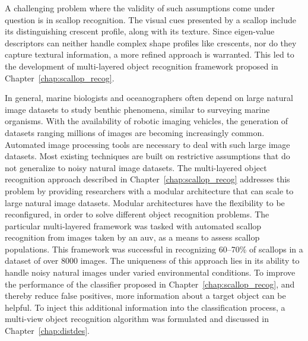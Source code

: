 A challenging problem where the validity of such assumptions come under question is in scallop recognition.
The visual cues presented by a scallop include its distinguishing crescent profile, along with its texture.
Since eigen-value descriptors can neither handle complex shape profiles like crescents, nor do they capture textural information,
a more refined approach is warranted.
This led to the development of multi-layered object recognition framework proposed in Chapter~\ref{chap:scallop_recog}.

In general, marine biologists and oceanographers often depend on large natural image datasets to study benthic phenomena, similar to surveying marine organisms. With the availability of robotic imaging vehicles, the generation of datasets ranging millions of images are becoming increasingly common. Automated image processing tools are necessary to deal with such large image datasets. Most existing techniques are built on restrictive assumptions that do not generalize to noisy natural image datasets. The multi-layered object recognition approach described in Chapter~\ref{chap:scallop_recog} addresses this problem by providing researchers with a modular architecture that can scale to large natural image datasets. Modular architectures have the flexibility to be reconfigured, in order to solve different object recognition problems.
The particular multi-layered framework was tasked with automated scallop recognition from images taken by an \gls{auv}, as a means to assess scallop populations. 
This framework was successful in recognizing 60--70\% of scallops in a dataset of over 8000 images.
The uniqueness of this approach lies in its ability to handle noisy natural images under varied environmental conditions.
To improve the performance of the classifier proposed in Chapter~\ref{chap:scallop_recog}, and thereby reduce false positives, more information about a target object can be helpful.
To inject this additional information into the classification process, a multi-view object recognition algorithm was formulated and discussed in Chapter~\ref{chap:distdes}.

